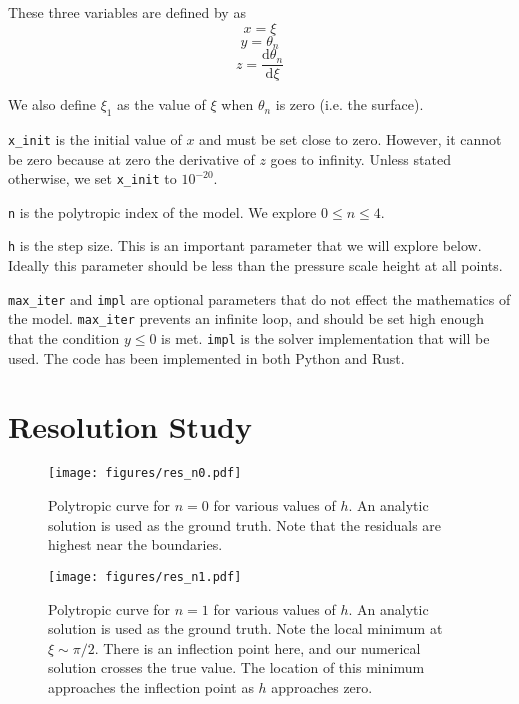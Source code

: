 \documentclass[twocolumn]{aastex631}
\begin{document}
These three variables are defined by \citet{textbook} as
\[ x = \xi\]
\[y = \theta_n\]
\[z = \frac{\text{d}\theta_n}{\text{d}\xi}\]

We also define $\xi_1$ as the value of $\xi$ when $\theta_n$ is
zero (i.e. the surface).

\texttt{x\_init} is the initial value of $x$ and must be set close to zero.
However, it cannot be zero because at zero the derivative of $z$ goes to infinity.
Unless stated otherwise, we set \texttt{x\_init} to $10^{-20}$.

\texttt{n} is the polytropic index of the model. We explore
$0\le n \le 4$.

\texttt{h} is the step size. This is an important parameter that we will
explore below. Ideally this parameter should be less than
the pressure scale height at all points.

\texttt{max\_iter} and \texttt{impl} are optional parameters that do not
effect the mathematics of the model. \texttt{max\_iter} prevents
an infinite loop, and should be set high enough that the
condition $y\le 0$ is met. \texttt{impl} is the solver
implementation that will be used. The code has been implemented
in both Python and Rust.


\section{Resolution Study}
\label{sec:res}

\begin{figure}
    \begin{centering}
        \texttt{[image: figures/res\_n0.pdf]}
        \caption{Polytropic curve for $n=0$ for various
        values of $h$. An analytic solution is used as
        the ground truth. Note that the residuals are highest
        near the boundaries.}
        \label{fig:res_n0}
    \end{centering}
\end{figure}

\begin{figure}
    \begin{centering}
        \texttt{[image: figures/res\_n1.pdf]}
        \caption{Polytropic curve for $n=1$ for various
        values of $h$. An analytic solution is used as
        the ground truth. Note the local minimum at
        $\xi\sim \pi/2$. There is an inflection point here,
        and our numerical solution crosses the true value.
        The location of this minimum approaches the inflection
        point as $h$ approaches zero.}
        \label{fig:res_n1}
    \end{centering}
\end{figure}
\end{document}
